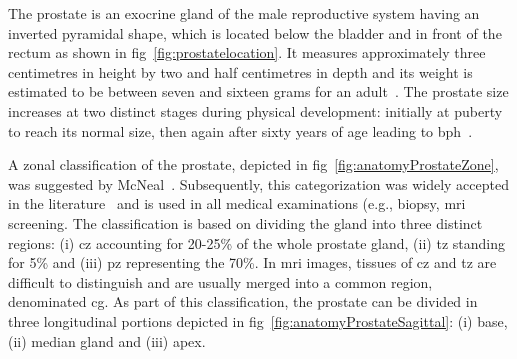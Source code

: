 The prostate is an exocrine gland of the male reproductive system having an inverted pyramidal shape, which is located below the bladder and in front of the rectum as shown in \acs{fig}~\ref{fig:prostatelocation}.
It measures approximately three centimetres in height by two and half centimetres in depth and its weight is estimated to be between seven and sixteen grams for an adult~\cite{Leissner1979}.
The prostate size increases at two distinct stages during physical development: initially at puberty to reach its normal size, then again after sixty years of age leading to \ac{bph}~\cite{Parfait2010}.

A zonal classification of the prostate, depicted in \acs{fig}~\ref{fig:anatomyProstateZone}, was suggested by McNeal\citeauthor{McNeal1981}~\cite{McNeal1981}.
Subsequently, this categorization was widely accepted in the literature~\cite{Hricak1987,Villers1991,Coakley2000,Parfait2010} and is used in all medical examinations (e.g., biopsy, \ac{mri} screening.
The classification is based on dividing the gland into three distinct regions: (i) \ac{cz} accounting for 20-25\% of the whole prostate gland, (ii) \ac{tz} standing for 5\% and (iii) \ac{pz} representing the 70\%.
In \ac{mri} images, tissues of \ac{cz} and \ac{tz} are difficult to distinguish and are usually merged into a common region, denominated \ac{cg}.
As part of this classification, the prostate can be divided in three longitudinal portions depicted in \acs{fig}~\ref{fig:anatomyProstateSagittal}: (i) base, (ii) median gland and (iii) apex.





